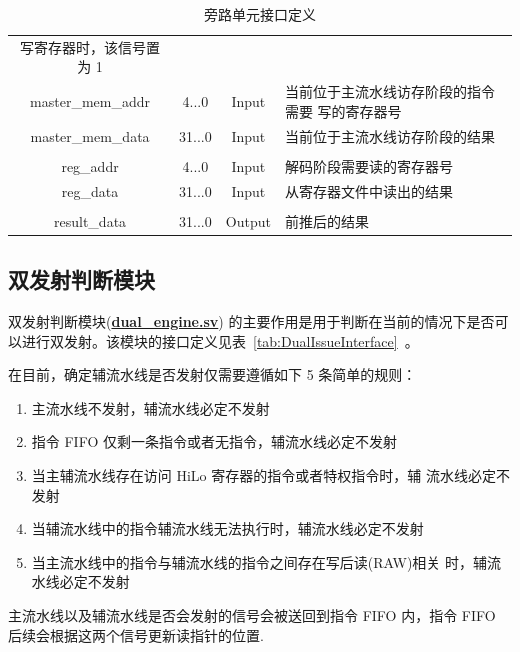 \documentclass[blue,normal,cn,hide]{elegantbook}
\begin{document}
\begin{table}
\begin{tabular}{cccm{}}
        写寄存器时，该信号置为 1 \\
        master\_mem\_addr & 4...0 & Input & 当前位于主流水线访存阶段的指令需要
        写的寄存器号 \\
        master\_mem\_data & 31...0 & Input & 当前位于主流水线访存阶段的结果 \\
        \\
        reg\_addr & 4...0 & Input & 解码阶段需要读的寄存器号 \\
        reg\_data & 31...0 & Input & 从寄存器文件中读出的结果 \\
        \\
        result\_data & 31...0 & Output & 前推后的结果 \\
        \bottomrule
    \end{tabular}
    \caption{旁路单元接口定义}
    \label{tab:ForwardingUnitInterface}
\end{table}

\subsection{双发射判断模块}

双发射判断模块(\href{https://github.com/name1e5s/Sirius/blob/master/dual\_engine.sv}{\textbf{dual\_engine.sv}})
的主要作用是用于判断在当前的情况下是否可以进行双发射。该模块的接口定义见表~\ref{tab:DualIssueInterface}~。

在目前，确定辅流水线是否发射仅需要遵循如下 5 条简单的规则：
\begin{enumerate}
    \item 主流水线不发射，辅流水线必定不发射
    \item 指令 FIFO 仅剩一条指令或者无指令，辅流水线必定不发射
    \item 当主辅流水线存在访问 HiLo 寄存器的指令或者特权指令时，辅
    流水线必定不发射
    \item 当辅流水线中的指令辅流水线无法执行时，辅流水线必定不发射
    \item 当主流水线中的指令与辅流水线的指令之间存在写后读(RAW)相关
    时，辅流水线必定不发射
\end{enumerate}

主流水线以及辅流水线是否会发射的信号会被送回到指令 FIFO 内，指令 FIFO
后续会根据这两个信号更新读指针的位置.
\end{document}
